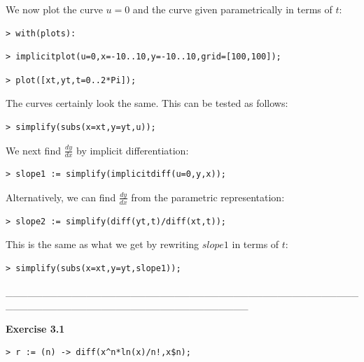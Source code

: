 \documentclass{article}
\begin{document}
\begin{Maple Normal}
We now plot the curve 
$u =0$ and the curve given parametrically in terms of 
$t$:
\end{Maple Normal}
\begin{lstlisting}
> with(plots):
\end{lstlisting}
\begin{lstlisting}
> implicitplot(u=0,x=-10..10,y=-10..10,grid=[100,100]);
\end{lstlisting}
\begin{lstlisting}
> plot([xt,yt,t=0..2*Pi]);
\end{lstlisting}
\begin{Maple Normal}
The curves certainly look the same.  This can be tested as follows:
\end{Maple Normal}
\begin{lstlisting}
> simplify(subs(x=xt,y=yt,u));
\end{lstlisting}
\begin{Maple Normal}
We next find 
$\frac{\mathit{dy}}{\mathit{dx}}$ by implicit differentiation:
\end{Maple Normal}
\begin{lstlisting}
> slope1 := simplify(implicitdiff(u=0,y,x));
\end{lstlisting}
\begin{Maple Normal}
Alternatively, we can find 
$\frac{\mathit{dy}}{\mathit{dx}}$ from the parametric representation:
\end{Maple Normal}
\begin{lstlisting}
> slope2 := simplify(diff(yt,t)/diff(xt,t));
\end{lstlisting}
\begin{Maple Normal}
This is the same as what we get by rewriting 
$\mathit{slope1}$ in terms of 
$t$:
\end{Maple Normal}
\begin{lstlisting}
> simplify(subs(x=xt,y=yt,slope1));
\end{lstlisting}
\begin{Maple Normal}
\_\_\_\_\_\_\_\_\_\_\_\_\_\_\_\_\_\_\_\_\_\_\_\_\_\_\_\_\_\_\_\_\_\_\_\_\_\_\_\_\_\_\_\_\_\_\_\_\_\_\_\_\_\_\_\_\_\_\_\_\_\_\_\_\_\_\_\_\_\_\_\_\_\_\_\_\_\_\_\_\_
\end{Maple Normal}
\begin{Maple Heading 2}
\textbf{Exercise 3.1}
\end{Maple Heading 2}
\begin{lstlisting}
> r := (n) -> diff(x^n*ln(x)/n!,x$n);
\end{lstlisting}
\end{document}

